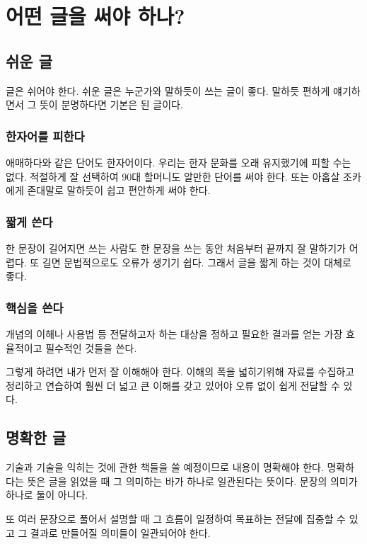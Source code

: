 \chapter{어떤 글을 써야 하나?}

\section{쉬운 글}

글은 쉬어야 한다. 쉬운 글은 누군가와 말하듯이 쓰는 글이 좋다. 말하듯 편하게 
얘기하면서 그 뜻이 분명하다면 기본은 된 글이다. 

\subsection{한자어를 피한다}

애매하다와 같은 단어도 한자어이다. 우리는 한자 문화를 오래 유지했기에 
피할 수는 없다. 적절하게 잘 선택하여 90대 할머니도 알만한 단어를 써야 한다. 
또는 아홉살 조카에게 존대말로 말하듯이 쉽고 편안하게 써야 한다. 

\subsection{짧게 쓴다}

한 문장이 길어지면 쓰는 사람도 한 문장을 쓰는 동안 처음부터 끝까지 잘 말하기가 
어렵다. 또 길면 문법적으로도 오류가 생기기 쉽다. 그래서 글을 짧게 하는 것이 
대체로 좋다. 

\subsection{핵심을 쓴다}

개념의 이해나 사용법 등 전달하고자 하는 대상을 정하고 필요한 결과를 얻는 가장 효율적이고 
필수적인 것들을 쓴다. 

그렇게 하려면 내가 먼저 잘 이해해야 한다. 이해의 폭을 넓히기위해 자료를 수집하고 
정리하고 연습하여 훨씬 더 넓고 큰 이해를 갖고 있어야 오류 없이 쉽게 전달할 수 있다. 

\section{명확한 글}

기술과 기술을 익히는 것에 관한 책들을 쓸 예정이므로 내용이 명확해야 한다. 명확하다는 뜻은 
글을 읽었을 때 그 의미하는 바가 하나로 일관된다는 뜻이다. 문장의 의미가 하나로 둘이 아니다. 

또 여러 문장으로 풀어서 설명할 때 그 흐름이 일정하여 목표하는 전달에 집중할 수 있고 
그 결과로 만들어질 의미들이 일관되어야 한다. 

